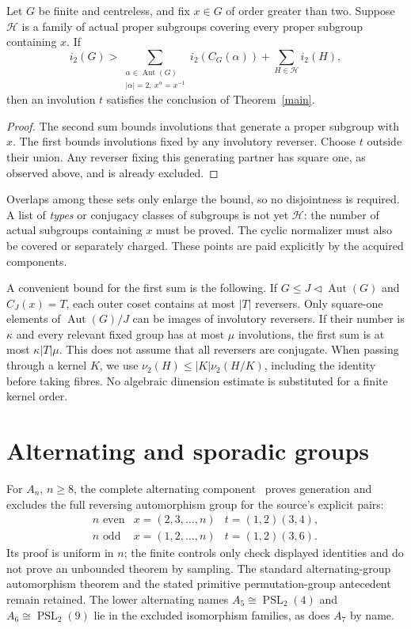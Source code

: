 \documentclass[11pt,a4paper]{article}
\newcommand{\Aut}{\operatorname{Aut}}\newcommand{\PSL}{\operatorname{PSL}}\newcommand{\PSU}{\operatorname{PSU}}\newcommand{\PSp}{\operatorname{PSp}}\newcommand{\Om}{\Omega}\newcommand{\Sp}{\operatorname{Sp}}
\newcommand{\ii}{i_2}\newcommand{\nuu}{\nu_2}
\begin{document}
\begin{lemma}\label{count}
Let $G$ be finite and centreless, and fix $x\in G$ of order greater than two.
Suppose $\mathcal H$ is a family of actual proper subgroups covering every
proper subgroup containing $x$. If
\[
 \ii(G)>
 \sum_{\substack{\alpha\in\Aut(G)\\|\alpha|=2,\ x^\alpha=x^{-1}}}
       \ii(C_G(\alpha))+
 \sum_{H\in\mathcal H}\ii(H),
\]
then an involution $t$ satisfies the conclusion of Theorem~\ref{main}.
\end{lemma}
\begin{proof}
The second sum bounds involutions that generate a proper subgroup with
$x$. The first bounds involutions fixed by any involutory reverser.
Choose $t$ outside their union. Any reverser fixing this generating
partner has square one, as observed above, and is already excluded.
\end{proof}
Overlaps among these sets only enlarge the bound, so no disjointness is
required. A list of \emph{types} or conjugacy classes of subgroups is not
yet $\mathcal H$: the number of actual subgroups containing $x$ must be
proved. The cyclic normalizer must also be covered or separately charged.
These points are paid explicitly by the acquired components.

A convenient bound for the first sum is the following. If
$G\le J\lhd\Aut(G)$ and $C_J(x)=T$, each outer coset contains at most
$|T|$ reversers. Only square-one elements of $\Aut(G)/J$ can be images
of involutory reversers. If their number is $\kappa$ and every relevant
fixed group has at most $\mu$ involutions, the first sum is at most
$\kappa|T|\mu$. This does not assume that all reversers are conjugate.
When passing through a kernel $K$, we use
$\nuu(H)\le |K|\nuu(H/K)$, including the identity before taking fibres.
No algebraic dimension estimate is substituted for a finite kernel order.

\section{Alternating and sporadic groups}
For $A_n$, $n\ge8$, the complete alternating component~\cite{Alt}
proves generation and excludes the full reversing automorphism group
for the source's explicit pairs:
\[
\begin{array}{c|cc}
n\text{ even}&x=(2,3,\ldots,n)&t=(1,2)(3,4),\\
n\text{ odd}&x=(1,2,\ldots,n)&t=(1,2)(3,6).
\end{array}
\]
Its proof is uniform in $n$; the finite controls only check displayed
identities and do not prove an unbounded theorem by sampling. The
standard alternating-group automorphism theorem and the stated primitive
permutation-group antecedent remain retained. The lower alternating
names $A_5\cong\PSL_2(4)$ and $A_6\cong\PSL_2(9)$ lie in the excluded
isomorphism families, as does $A_7$ by name.
\end{document}
